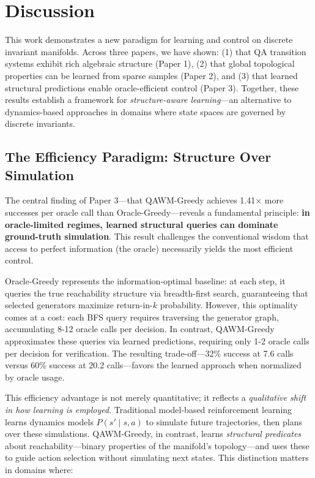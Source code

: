 
\section{Discussion}

This work demonstrates a new paradigm for learning and control on discrete invariant manifolds. Across three papers, we have shown: (1) that QA transition systems exhibit rich algebraic structure (Paper 1), (2) that global topological properties can be learned from sparse samples (Paper 2), and (3) that learned structural predictions enable oracle-efficient control (Paper 3). Together, these results establish a framework for \textit{structure-aware learning}—an alternative to dynamics-based approaches in domains where state spaces are governed by discrete invariants.

\subsection{The Efficiency Paradigm: Structure Over Simulation}

The central finding of Paper 3—that QAWM-Greedy achieves 1.41$\times$ more successes per oracle call than Oracle-Greedy—reveals a fundamental principle: \textbf{in oracle-limited regimes, learned structural queries can dominate ground-truth simulation}. This result challenges the conventional wisdom that access to perfect information (the oracle) necessarily yields the most efficient control.

Oracle-Greedy represents the information-optimal baseline: at each step, it queries the true reachability structure via breadth-first search, guaranteeing that selected generators maximize return-in-$k$ probability. However, this optimality comes at a cost: each BFS query requires traversing the generator graph, accumulating 8-12 oracle calls per decision. In contrast, QAWM-Greedy approximates these queries via learned predictions, requiring only 1-2 oracle calls per decision for verification. The resulting trade-off—32\% success at 7.6 calls versus 60\% success at 20.2 calls—favors the learned approach when normalized by oracle usage.

This efficiency advantage is not merely quantitative; it reflects a \textit{qualitative shift in how learning is employed}. Traditional model-based reinforcement learning learns dynamics models $P(s' \mid s, a)$ to simulate future trajectories, then plans over these simulations. QAWM-Greedy, in contrast, learns \textit{structural predicates} about reachability—binary properties of the manifold's topology—and uses these to guide action selection without simulating next states. This distinction matters in domains where:

